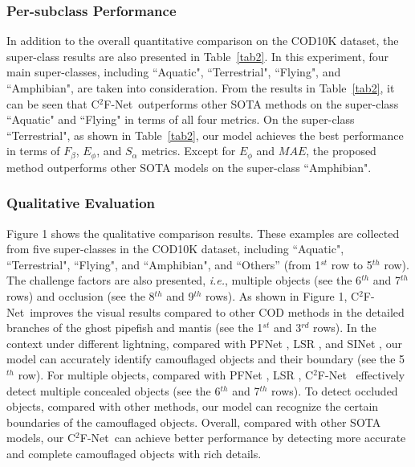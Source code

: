 \documentclass[lettersize,journal]{IEEEtran}
\newcommand{\figref}[1]{Figure 1}%
\newcommand{\figref}[1]{Fig.~\ref{#1}}%
\newcommand{\our}{{C$^2$F-Net}}
\newcommand{\ourM}{{C$^2$F-Net}}
\def\ie{\emph{i.e.}}
\begin{document}
\begin{figure*}[ht]
\end{figure*}
\subsubsection{Per-subclass Performance}\label{subclass}

In addition to the overall quantitative comparison on the COD10K dataset, the super-class results are also presented in Table~\ref{tab2}. In this experiment, four main super-classes, including ``Aquatic", ``Terrestrial", ``Flying", and ``Amphibian", are taken into consideration. 
From the results in Table~\ref{tab2}, it can be seen that \ourM~outperforms other SOTA methods on the super-class ``Aquatic" and ``Flying" in terms of all four metrics.
On the super-class ``Terrestrial", as shown in Table~\ref{tab2}, our model achieves the best performance in terms of {$F_\beta$}, {$E_\phi$}, and {$S_\alpha$} metrics. Except for {$E_\phi$} and $MAE$, the proposed method outperforms other SOTA models on the super-class ``Amphibian". 

\subsubsection{Qualitative Evaluation}

\figref{results} shows the qualitative comparison results. These examples are collected from five super-classes in the COD10K dataset, including ``Aquatic", ``Terrestrial", ``Flying", and ``Amphibian", and ``Others'' (from 1$^{st}$ row to 5$^{th}$ row). The challenge factors are also presented, \ie, multiple objects (see the 6$^{th}$ and 7$^{th}$ rows) and occlusion (see the 8$^{th}$ and 9$^{th}$ rows). 
As shown in \figref{results}, \ourM~improves the visual results compared to other COD methods in the detailed branches of the ghost pipefish and mantis (see the 1$^{st}$ and 3$^{rd}$ rows). In the context under different lightning, compared with PFNet \cite{pfnet}, LSR \cite{lsr}, and SINet \cite{sinet}, our model can accurately identify camouflaged objects and their boundary (see the 5$^{th}$ row). For multiple objects, compared with PFNet \cite{pfnet}, LSR \cite{lsr}, \ourM~ effectively detect multiple concealed objects (see the 6$^{th}$ and 7$^{th}$ rows). To detect occluded objects, compared with other methods, our model can recognize the certain boundaries of the camouflaged objects. Overall, compared with other SOTA models, our \our~can achieve better performance by detecting more accurate and complete camouflaged objects with rich details.
\end{document}

